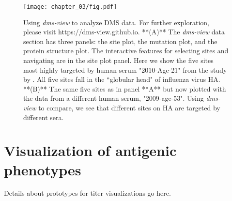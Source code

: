 \begin{figure}[ht]
  \centering
  \texttt{[image: chapter\_03/fig.pdf]}
  \caption{Using \emph{dms-view} to analyze DMS data. For further exploration, please visit https://dms-view.github.io. **(A)** The \emph{dms-view} data section has three panels: the site plot, the mutation plot, and the protein structure plot. The interactive features for selecting sites and navigating are in the site plot panel. Here we show the five sites most highly targeted by human serum "2010-Age-21" from the study by \citet{lee2019mapping}. All five sites fall in the ``globular head" of influenza virus HA. **(B)** The same five sites as in panel **A** but now plotted with the data from a different human serum, "2009-age-53". Using \emph{dms-view} to compare, we see that different sites on HA are targeted by different sera. \label{fig:fig}}
\end{figure}

\section{Visualization of antigenic phenotypes}

Details about prototypes for titer visualizations go here.
